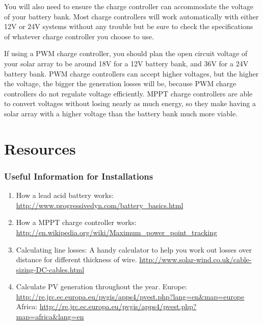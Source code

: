 \documentclass{article}
\theoremstyle{definition}
\theoremstyle{definition}
\theoremstyle{remark}
\begin{document}
  You will also need to ensure the charge controller can accommodate the voltage of your battery bank. Most charge controllers will work automatically with either 12V or 24V systems without any trouble but be sure to check the specifications of whatever charge controller you choose to use.

  If using a PWM charge controller, you should plan the open circuit voltage of your solar array to be around 18V for a 12V battery bank, and 36V for a 24V battery bank. PWM charge controllers can accept higher voltages, but the higher the voltage, the bigger the generation losses will be, because PWM charge controllers do not regulate voltage efficiently. MPPT charge controllers are able to convert voltages without losing nearly as much energy, so they make having a solar array with a higher voltage than the battery bank much more viable.


{\color{blue}\section{Resources}} %
\label{sec:resources}

  \subsubsection{Useful Information for Installations} %
  \label{ssub:useful_information_for_installations}

    \begin{enumerate}
      \item How a lead acid battery works: \href{http://www.progressivedyn.com/battery\_basics.html}{http://www.progressivedyn.com/battery\_basics.html}
      \item How a MPPT charge controller works: \newline
      \href{http://en.wikipedia.org/wiki/Maximum\_power\_point\_tracking}{http://en.wikipedia.org/wiki/Maximum\_power\_point\_tracking}
      \item Calculating line losses: A handy calculator to help you work out losses over distance for different \newline
      thickness of wire. \href{http://www.solar-wind.co.uk/cable-sizing-DC-cables.html}{http://www.solar-wind.co.uk/cable-sizing-DC-cables.html}
      \item Calculate PV generation throughout the year. \newline
      Europe: \href{http://re.jrc.ec.europa.eu/pvgis/apps4/pvest.php?lang=en\&map=europe}{http://re.jrc.ec.europa.eu/pvgis/apps4/pvest.php?lang=en\&map=europe} \newline
      Africa: \href{http://re.jrc.ec.europa.eu/pvgis/apps4/pvest.php?map=africa\&lang=en}{http://re.jrc.ec.europa.eu/pvgis/apps4/pvest.php?map=africa\&lang=en}
    \end{enumerate}
  
\end{document}
